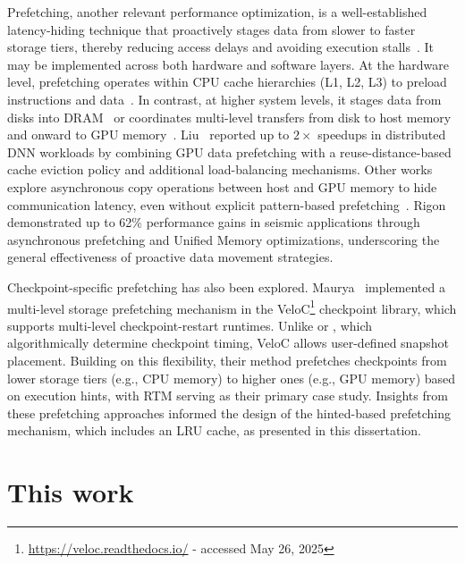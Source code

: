 \documentclass[Ingles,Final]{ic-tese-v3}
\begin{document}
Prefetching, another relevant performance optimization, is a well-established latency-hiding technique that proactively stages data from slower to faster storage tiers, thereby reducing access delays and avoiding execution stalls~\cite{mittal2017,vanderwiel2000}. It may be implemented across both hardware and software layers. At the hardware level, prefetching operates within CPU cache hierarchies (L1, L2, L3) to preload instructions and data~\cite{mittal2017,emma2005,hennessy}. In contrast, at higher system levels, it stages data from disks into DRAM~\cite{patterson1995,butt2007} or coordinates multi-level transfers from disk to host memory and onward to GPU memory~\cite{maurya2023}. Liu~\etal\cite{liu2022} reported up to $2\times$ speedups in distributed DNN workloads by combining GPU data prefetching with a reuse-distance-based cache eviction policy and additional load-balancing mechanisms. Other works explore asynchronous copy operations between host and GPU memory to hide communication latency, even without explicit pattern-based prefetching~\cite{jeong2022,jung2020}. Rigon~\etal\cite{rigon2024} demonstrated up to 62\% performance gains in seismic applications through asynchronous prefetching and Unified Memory optimizations, underscoring the general effectiveness of proactive data movement strategies.

Checkpoint-specific prefetching has also been explored. Maurya~\etal\cite{maurya2023} implemented a multi-level storage prefetching mechanism in the VeloC\footnote{\url{https://veloc.readthedocs.io/} - accessed May 26, 2025} checkpoint library, which supports multi-level checkpoint-restart runtimes. Unlike \revolve or \zcut, which algorithmically determine checkpoint timing, VeloC allows user-defined snapshot placement. Building on this flexibility, their method prefetches checkpoints from lower storage tiers (e.g., CPU memory) to higher ones (e.g., GPU memory) based on execution hints, with RTM serving as their primary case study. Insights from these prefetching approaches informed the design of the hinted-based prefetching mechanism, which includes an LRU cache, as presented in this dissertation.




\section{This work}
\label{sec:thiswork}
\end{document}

